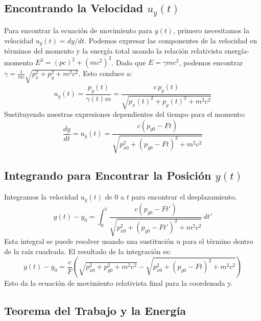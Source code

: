 \documentclass[11pt,a4paper]{article}
\begin{document}
\subsection{Encontrando la Velocidad \texorpdfstring{$u_y(t)$}{uy(t)}}
Para encontrar la ecuación de movimiento para $y(t)$, primero necesitamos la velocidad $u_y(t) = dy/dt$. Podemos expresar las componentes de la velocidad en términos del momento y la energía total usando la relación relativista energía-momento $E^2 = (pc)^2 + (mc^2)^2$. Dado que $E=\gamma m c^2$, podemos encontrar $\gamma = \frac{1}{mc}\sqrt{p_x^2 + p_y^2 + m^2c^2}$. Esto conduce a:
\[ u_y(t) = \frac{p_y(t)}{\gamma(t) m} = \frac{c \, p_y(t)}{\sqrt{p_x(t)^2 + p_y(t)^2 + m^2c^2}} \]
Sustituyendo nuestras expresiones dependientes del tiempo para el momento:
\[ \frac{dy}{dt} = u_y(t) = \frac{c (p_{y0} - Ft)}{\sqrt{p_{x0}^2 + (p_{y0} - Ft)^2 + m^2c^2}} \]

\subsection{Integrando para Encontrar la Posición \texorpdfstring{$y(t)$}{y(t)}}
Integramos la velocidad $u_y(t)$ de $0$ a $t$ para encontrar el desplazamiento.
\[ y(t) - y_0 = \int_0^t \frac{c (p_{y0} - Ft')}{\sqrt{p_{x0}^2 + (p_{y0} - Ft')^2 + m^2c^2}} \, dt' \]
Esta integral se puede resolver usando una sustitución u para el término dentro de la raíz cuadrada. El resultado de la integración es:
\[ y(t) - y_0 = \frac{c}{F} \left( \sqrt{p_{x0}^2 + p_{y0}^2 + m^2c^2} - \sqrt{p_{x0}^2 + (p_{y0} - Ft)^2 + m^2c^2} \right) \]
Esto da la ecuación de movimiento relativista final para la coordenada y.

\subsection{Teorema del Trabajo y la Energía}
\end{document}
